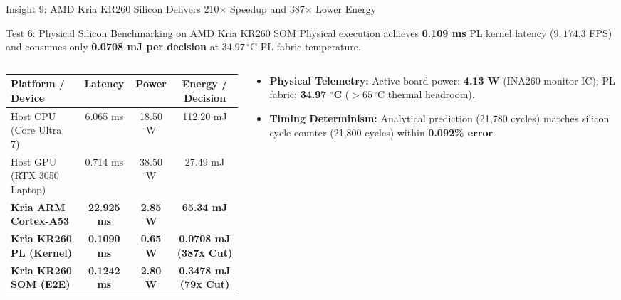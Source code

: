 \documentclass[aspectratio=169, 10pt]{beamer}
\begin{document}
\begin{frame}{Insight 9: AMD Kria KR260 Silicon Delivers 210$\times$ Speedup and 387$\times$ Lower Energy}
  \begin{block}{Test 6: Physical Silicon Benchmarking on AMD Kria KR260 SOM}
    Physical execution achieves \textbf{0.109 ms} PL kernel latency ($9,174.3$ FPS) and consumes only \textbf{0.0708 mJ per decision} at $34.97\,^\circ\text{C}$ PL fabric temperature.
  \end{block}
  \vspace{-0.2cm}
  \begin{columns}[T]
    \begin{column}{0.54\textwidth}
      \setlength{\tabcolsep}{2pt}
      \begin{table}
        \centering
        \scriptsize
        \begin{tabular}{lccc}
          \toprule
          \textbf{Platform / Device} & \textbf{Latency} & \textbf{Power} & \textbf{Energy / Decision} \\
          \midrule
          Host CPU (Core Ultra 7) & 6.065 ms & 18.50 W & 112.20 mJ \\
          Host GPU (RTX 3050 Laptop) & 0.714 ms & 38.50 W & 27.49 mJ \\
          \textbf{Kria ARM Cortex-A53} & \textbf{22.925 ms} & \textbf{2.85 W} & \textbf{65.34 mJ} \\
          \textbf{Kria KR260 PL (Kernel)} & \textbf{0.1090 ms} & \textbf{0.65 W} & \textbf{0.0708 mJ (387x Cut)} \\
          \textbf{Kria KR260 SOM (E2E)} & \textbf{0.1242 ms} & \textbf{2.80 W} & \textbf{0.3478 mJ (79x Cut)} \\
          \bottomrule
        \end{tabular}
      \end{table}
    \end{column}
    \begin{column}{0.44\textwidth}
      \begin{itemize}
        \item \textbf{Physical Telemetry:} Active board power: \textbf{4.13 W} (INA260 monitor IC); PL fabric: \textbf{34.97 $^\circ$C} ($>65\,^\circ\text{C}$ thermal headroom).
        \item \textbf{Timing Determinism:} Analytical prediction (21,780 cycles) matches silicon cycle counter (21,800 cycles) within \textbf{0.092\% error}.
      \end{itemize}
    \end{column}
  \end{columns}
\end{frame}
\end{document}
